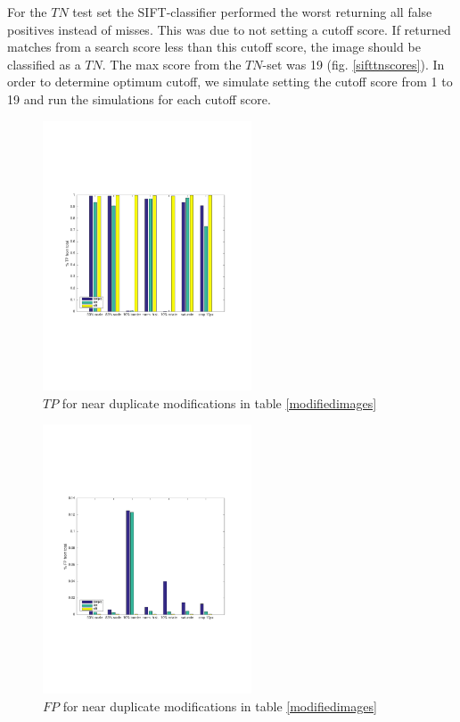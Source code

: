 \documentclass[english,12pt,a4paper,pdftex,elec,utf8]{aaltothesis}
\begin{document}
For the $TN$ test set the SIFT-classifier performed the worst returning all false positives instead of misses. This was due to not setting a cutoff score. If returned matches from a search score less than this cutoff score, the image should be classified as a $TN$. The max score from the $TN$-set was 19 (fig. \ref{sifttnscores}). In order to determine optimum cutoff, we simulate setting the cutoff score from 1 to 19 and run the simulations for each cutoff score.



\begin{figure}[htb]
\begin{center}
\includegraphics[height=8cm]{figures/tpBar}
\end{center}
\caption{ $TP$ for near duplicate modifications in table \ref{modifiedimages} }
\label{tptotal}
\end{figure}


\begin{figure}[htb]
\begin{center}
\includegraphics[height=8cm]{figures/fpBar}
\end{center}
\caption{ $FP$ for near duplicate modifications in table \ref{modifiedimages} }
\label{fptotal}
\end{figure}
\end{document}
